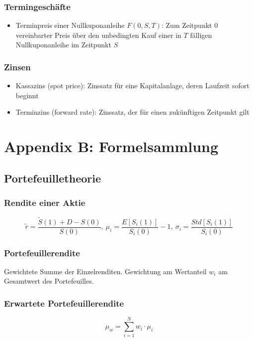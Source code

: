 \subsubsection{Termingeschäfte}
\begin{itemize}
	\item Terminpreis einer Nullkuponanleihe \(F(0, S, T)\): Zum Zeitpunkt \(0\) vereinbarter Preis über den unbedingten Kauf einer in \(T\) fälligen Nullkuponanleihe im Zeitpunkt \(S\)
\end{itemize}

\subsubsection{Zinsen}
\begin{itemize}
	\item Kassazins (spot price): Zinssatz für eine Kapitalanlage, deren Laufzeit sofort beginnt
	\item Terminzins (forward rate): Zinssatz, der für einen zukünftigen Zeitpunkt gilt
\end{itemize}



\section{Appendix B: Formelsammlung}

\subsection{Portefeuilletheorie}

\subsubsection{Rendite einer Aktie}
\[\tilde{r} = \frac{\tilde{S} (1) + D - S(0)}{S(0)},~\mu_i = \frac{E[S_i(1)]}{S_i(0)} - 1,~\sigma_i = \frac{Std[S_i(1)]}{S_i(0)}\]

\subsubsection{Portefeuillerendite}
Gewichtete Summe der Einzelrenditen. Gewichtung am Wertanteil \(w_i\) am Gesamtwert des Portefeuilles.

\subsubsection{Erwartete Portefeuillerendite}
\[\mu_w = \sum_{i=1}^{N} w_i \cdot \mu_i\]

